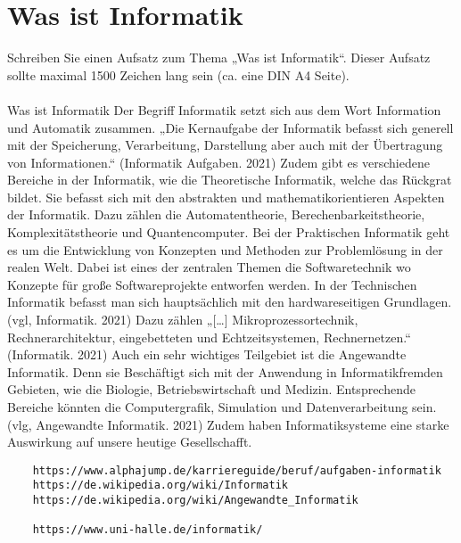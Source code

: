\section{Was ist Informatik}
Schreiben Sie einen Aufsatz zum Thema „Was ist Informatik“. Dieser Aufsatz sollte maximal 1500 Zeichen lang sein (ca. eine DIN A4 Seite).\\
\\
Was ist Informatik	
Der Begriff Informatik setzt sich aus dem Wort Information und Automatik zusammen. „Die Kernaufgabe der Informatik befasst sich generell mit der Speicherung, Verarbeitung, Darstellung aber auch mit der Übertragung von Informationen.“ (Informatik Aufgaben. 2021) 
Zudem gibt es verschiedene Bereiche in der Informatik, wie die 
Theoretische Informatik, welche das Rückgrat bildet. Sie befasst sich mit den abstrakten und mathematikorientieren Aspekten der Informatik. Dazu zählen die Automatentheorie, Berechenbarkeitstheorie, Komplexitätstheorie und Quantencomputer. 
Bei der Praktischen Informatik geht es um die Entwicklung von Konzepten und Methoden zur Problemlösung in der realen Welt. Dabei ist eines der zentralen Themen die Softwaretechnik wo Konzepte für große Softwareprojekte entworfen werden. 
In der Technischen Informatik befasst man sich hauptsächlich mit den hardwareseitigen Grundlagen. (vgl, Informatik. 2021) Dazu zählen „[…] Mikroprozessortechnik, Rechnerarchitektur, eingebetteten und Echtzeitsystemen, Rechnernetzen.“ (Informatik. 2021) 
Auch ein sehr wichtiges Teilgebiet ist die Angewandte Informatik. Denn sie Beschäftigt sich mit der Anwendung in Informatikfremden Gebieten, wie die Biologie, Betriebswirtschaft und Medizin. Entsprechende Bereiche könnten die Computergrafik, Simulation und Datenverarbeitung sein.
(vlg, Angewandte Informatik. 2021) Zudem haben Informatiksysteme eine starke Auswirkung auf unsere heutige Gesellschafft. 

\begin{lstlisting}
	https://www.alphajump.de/karriereguide/beruf/aufgaben-informatik
	https://de.wikipedia.org/wiki/Informatik
	https://de.wikipedia.org/wiki/Angewandte_Informatik

	https://www.uni-halle.de/informatik/
\end{lstlisting}